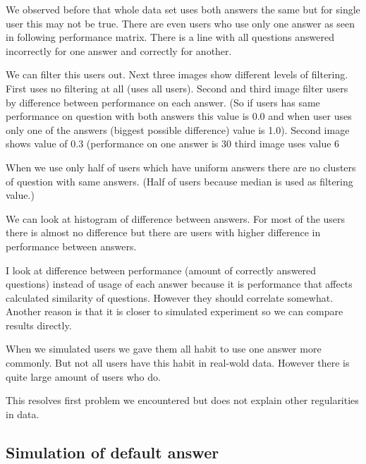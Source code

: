 \documentclass[
  digital, %
  table,   %
  nolof,     %
  nolot,     %
  nocover
]{fithesis3}
\begin{document}
We observed before that whole data set uses both answers the same but
for single user this may not be true. There are even users who use only
one answer as seen in following performance matrix. There is a line with
all questions answered incorrectly for one answer and correctly for
another.


We can filter this users out. Next three images show different levels of
filtering. First uses no filtering at all (uses all users). Second and
third image filter users by difference between performance on each
answer. (So if users has same performance on question with both answers
this value is 0.0 and when user uses only one of the answers (biggest
possible difference) value is 1.0). Second image shows value of 0.3
(performance on one answer is 30%
third image uses value 6%


When we use only half of users which have uniform answers there are no
clusters of question with same answers. (Half of users because median is
used as filtering value.)

We can look at histogram of difference between answers. For most of the
users there is almost no difference but there are users with higher
difference in performance between answers.


I look at difference between performance (amount of correctly answered
questions) instead of usage of each answer because it is performance
that affects calculated similarity of questions. However they should
correlate somewhat. Another reason is that it is closer to simulated
experiment so we can compare results directly.

When we simulated users we gave them all habit to use one answer more
commonly. But not all users have this habit in real-wold data. However
there is quite large amount of users who do.

This resolves first problem we encountered but does not explain other
regularities in data.

\subsection{Simulation of default answer}\label{simulation-of-default-answer}
\end{document}
